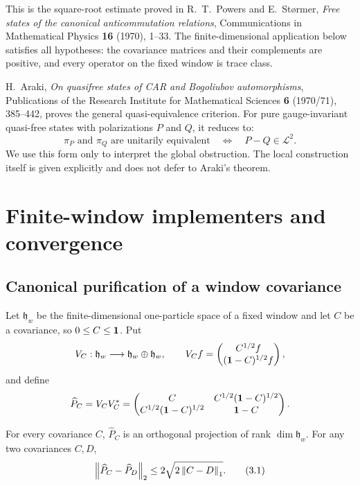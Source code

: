 This is the square-root estimate proved in
R.~T.~Powers and E.~St{\o}rmer,
\emph{Free states of the canonical anticommutation relations},
Communications in Mathematical Physics \textbf{16} (1970), 1--33.
The finite-dimensional application below satisfies all hypotheses:
the covariance matrices and their complements are positive, and every
operator on the fixed window is trace class.

\begin{remark}
H.~Araki, \emph{On quasifree states of CAR and Bogoliubov
automorphisms}, Publications of the Research Institute for Mathematical
Sciences \textbf{6} (1970/71), 385--442, proves the general
quasi-equivalence criterion.  For pure gauge-invariant quasi-free states
with polarizations $P$ and $Q$, it reduces to:
\[
 \pi_P\text{ and }\pi_Q\text{ are unitarily equivalent}
 \quad\Longleftrightarrow\quad P-Q\in\mathcal L^2.
\]
We use this form only to interpret the global obstruction.  The local
construction itself is given explicitly and does not defer to Araki's
theorem.
\end{remark}

\section{Finite-window implementers and convergence}
\label{sec:local}

\subsection{Canonical purification of a window covariance}

Let $\mathfrak h_w$ be the finite-dimensional one-particle space of a
fixed window and let $C$ be a covariance, so $0\le C\le\mathbf 1$.  Put
\[
 V_C:\mathfrak h_w\longrightarrow\mathfrak h_w\oplus\mathfrak h_w,
 \qquad
 V_C f=
 \begin{pmatrix}C^{1/2}f\\(\mathbf 1-C)^{1/2}f\end{pmatrix},
\]
and define
\[
 \widehat P_C=V_CV_C^*
 =
 \begin{pmatrix}
 C& C^{1/2}(\mathbf 1-C)^{1/2}\\
 C^{1/2}(\mathbf 1-C)^{1/2}&\mathbf 1-C
 \end{pmatrix}.
\]

\begin{lemma}
\label{lem:purification}
For every covariance $C$, $\widehat P_C$ is an orthogonal projection of
rank $\dim\mathfrak h_w$.  For any two covariances $C,D$,
\[
 \left\lVert \widehat P_C-\widehat P_D\right\rVert_2
 \le 2\sqrt{2\left\lVert C-D\right\rVert_1}.
\tag{3.1}\label{eq:purification-bound}
\]
\end{lemma}

